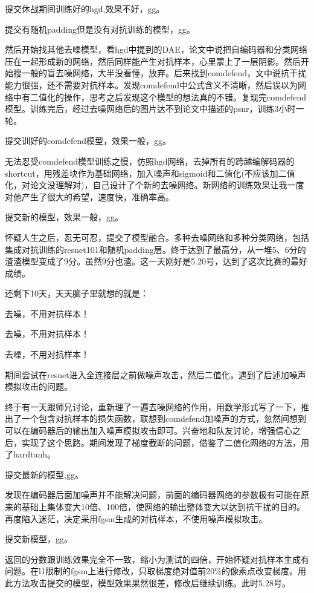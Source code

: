 \documentclass[]{article}
\begin{document}
提交休战期间训练好的hgd,效果不好，gg。

提交有随机padding但是没有对抗训练的模型，gg。

然后开始找其他去噪模型，看hgd中提到的DAE，论文中说把自编码器和分类网络压在一起形成新的网络，然后同样能产生对抗样本，心里蒙上了一层阴影。然后开始搜一般的盲去噪网络，大半没看懂，放弃。后来找到comdefend，文中说抗干扰能力很强，还不需要对抗样本。发现comdefend中公式含义不清晰，然后误以为网络中有二值化的操作，思考之后发现这个模型的想法真的不错。复现完comdefend模型。训练完后，经过去噪网络后的图片达不到论文中描述的psnr，训练3小时一轮。

提交训好的comdefend模型，效果一般，gg。

无法忍受comdefend模型训练之慢，仿照hgd网络，去掉所有的跨越编解码器的shortcut，用残差块作为基础网络，加入噪声和sigmoid和二值化(不应该加二值化，对论文没理解对)，自己设计了个新的去噪网络。新网络的训练效果让我一度对他产生了很大的希望，速度快，准确率高。

提交新的模型，效果一般，gg。

怀疑人生之后，忍无可忍，提交了模型融合。多种去噪网络和多种分类网络，包括集成对抗训练的resnet101和随机padding层。终于达到了最高分，从一堆5、6分的渣渣模型变成了9分。虽然9分也渣。这一天刚好是5.20号，达到了这次比赛的最好成绩。

还剩下10天，天天脑子里就想的就是：

去噪，不用对抗样本！

去噪，不用对抗样本！

去噪，不用对抗样本！

期间尝试在resnet进入全连接层之前做噪声攻击，然后二值化，遇到了后述加噪声模拟攻击的问题。

终于有一天跟师兄讨论，重新理了一遍去噪网络的作用，用数学形式写了一下，推出了一个包含对抗样本的损失函数，联想到comdefend加噪声的方式，忽然间想到可以在编码器后的输出加入噪声模拟攻击即可。兴奋地和队友讨论，增强信心之后，实现了这个思路。期间发现了梯度截断的问题，借鉴了二值化网络的方法，用了hardtanh。

提交最新的模型,gg。

发现在编码器后面加噪声并不能解决问题，前面的编码器网络的参数极有可能在原来的基础上集体变大10倍、100倍，使网络的输出整体变大以达到抗干扰的目的。再度陷入迷茫，决定采用fgsm生成的对抗样本，不使用噪声模拟攻击。

提交新模型，gg。

返回的分数跟训练效果完全不一致，缩小为测试的四倍，开始怀疑对抗样本生成有问题。在l1限制的fgsm上进行修改，只取梯度绝对值前20\%的像素点改变梯度。用此方法攻击提交的模型，模型效果果然很差，修改后继续训练。此时5.28号。
\end{document}
